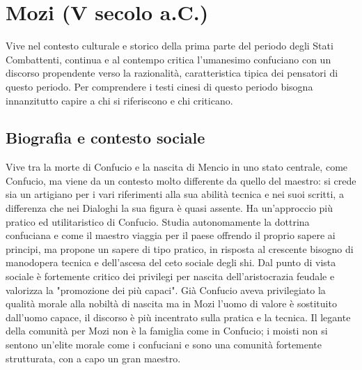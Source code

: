 \documentclass[10pt,a4paper]{report}
\begin{document}
\section{Mozi (V secolo a.C.)}
Vive nel contesto culturale e storico della prima parte del periodo degli Stati Combattenti, continua e al contempo critica l'umanesimo confuciano con un discorso propendente verso la razionalità, caratteristica tipica dei pensatori di questo periodo. Per comprendere i testi cinesi di questo periodo bisogna innanzitutto capire a chi si riferiscono e chi criticano. 
\subsection{Biografia e contesto sociale}
Vive tra la morte di Confucio e la nascita di Mencio in uno stato centrale, come Confucio, ma viene da un contesto molto differente da quello del maestro: si crede sia un artigiano per i vari riferimenti alla sua abilità tecnica e nei suoi scritti, a differenza che nei Dialoghi la sua figura è quasi assente. Ha un'approccio più pratico ed utilitaristico di Confucio. Studia autonomamente la dottrina confuciana e come il maestro viaggia per il paese offrendo il proprio sapere ai principi, ma propone un sapere di tipo pratico, in risposta al crescente bisogno di manodopera tecnica e dell'ascesa del ceto sociale degli shi. Dal punto di vista sociale è fortemente critico dei privilegi per nascita dell'aristocrazia feudale e valorizza la "promozione dei più capaci". Già Confucio aveva privilegiato la qualità morale alla nobiltà di nascita ma in Mozi l'uomo di valore è sostituito dall'uomo capace, il discorso è più incentrato sulla pratica e la tecnica. Il legante della comunità per Mozi non è la famiglia come in Confucio; i moisti non si sentono un'elite morale come i confuciani e sono una comunità fortemente strutturata, con a capo un gran maestro.\\
\end{document}
